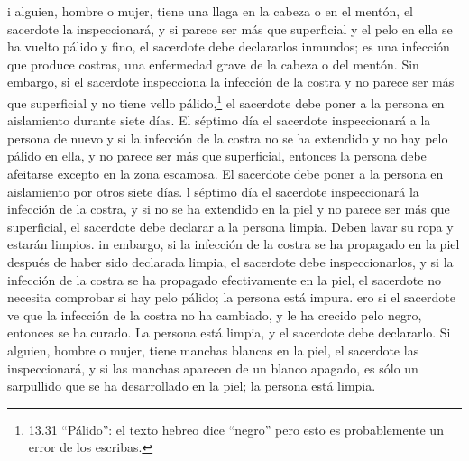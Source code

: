  i alguien, hombre o mujer, tiene una llaga en la cabeza o
en el mentón,  el sacerdote la inspeccionará, y si parece
ser más que superficial y el pelo en ella se ha vuelto pálido y fino, el
sacerdote debe declararlos inmundos; es una infección que produce
costras, una enfermedad grave de la cabeza o del mentón. 
Sin embargo, si el sacerdote inspecciona la infección de la costra y no
parece ser más que superficial y no tiene vello pálido,\footnote{13.31
  ``Pálido'': el texto hebreo dice ``negro'' pero esto es probablemente
  un error de los escribas.} el sacerdote debe poner a la persona en
aislamiento durante siete días.  El séptimo día el
sacerdote inspeccionará a la persona de nuevo y si la infección de la
costra no se ha extendido y no hay pelo pálido en ella, y no parece ser
más que superficial,  entonces la persona debe afeitarse
excepto en la zona escamosa. El sacerdote debe poner a la persona en
aislamiento por otros siete días.  l séptimo día el
sacerdote inspeccionará la infección de la costra, y si no se ha
extendido en la piel y no parece ser más que superficial, el sacerdote
debe declarar a la persona limpia. Deben lavar su ropa y estarán
limpios.  in embargo, si la infección de la costra se ha
propagado en la piel después de haber sido declarada limpia,
 el sacerdote debe inspeccionarlos, y si la infección de la
costra se ha propagado efectivamente en la piel, el sacerdote no
necesita comprobar si hay pelo pálido; la persona está impura.
 ero si el sacerdote ve que la infección de la costra no ha
cambiado, y le ha crecido pelo negro, entonces se ha curado. La persona
está limpia, y el sacerdote debe declararlo.  Si alguien,
hombre o mujer, tiene manchas blancas en la piel,  el
sacerdote las inspeccionará, y si las manchas aparecen de un blanco
apagado, es sólo un sarpullido que se ha desarrollado en la piel; la
persona está limpia.

